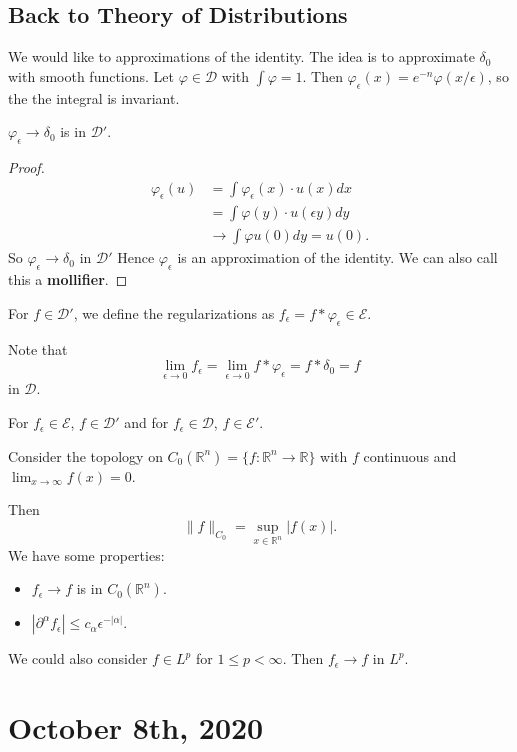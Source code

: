 \documentclass[11pt]{scrartcl}
\newcommand{\R}{\mathbb{R}}
\let \phi \varphi
\begin{document}
\subsection{Back to Theory of Distributions}
We would like to approximations of the identity.  The idea is to approximate $\delta_0$ with smooth functions. Let $\phi \in \mathcal D$ with $\int \phi = 1$.  Then $\phi_\epsilon(x) = e^{-n}\phi(x/\epsilon)$, so the the integral is invariant.
\begin{proposition} $\phi_\epsilon\rightarrow \delta_0$ is in $\mathcal D'$.
\end{proposition}
\begin{proof}
\begin{align*}
\phi_\epsilon(u) &= \int \phi_\epsilon(x) \cdot u(x)dx \\
&= \int \phi(y) \cdot u(\epsilon y) dy \\
&\rightarrow \int \phi u(0) dy = u(0).
\end{align*}
So $\phi_\epsilon \rightarrow \delta_0$ in $\mathcal D'$  Hence $\phi_\epsilon$ is an approximation of the identity.  We can also call this a \textbf{mollifier}.
\end{proof} 
For $f \in \mathcal D'$, we define the regularizations as $f_\epsilon = f * \phi_\epsilon \in \mathcal E$.  

Note that $$\lim_{\epsilon \rightarrow 0} f_\epsilon = \lim_{\epsilon \rightarrow 0} f*\phi_\epsilon = f*\delta_0 = f$$ in $\mathcal D$. 

For $f_{\epsilon} \in \mathcal E$, $f \in \mathcal D'$ and for $f_{\epsilon} \in \mathcal D$, $f \in \mathcal E'$.

\begin{example} Consider the topology on $C_0(\R^n) = \{f : \R^n \rightarrow \R\}$ with $f $ continuous and $\lim_{x \rightarrow \infty} f(x) = 0$. 

Then $$\|f\|_{C_0} = \sup_{x \in \R^n}|f(x)|.$$
We have some properties:
\begin{itemize}
\item $f_\epsilon \rightarrow f$ is in $C_0(\R^n)$.
\item $|\partial^{\alpha} f_\epsilon| \le c_{\alpha}\epsilon^{-|\alpha|}.$
\end{itemize}

We could also consider $f \in L^p$ for $1 \le p < \infty$.  Then $f_{\epsilon} \rightarrow f$ in $L^p$.  
\end{example} 
\pagebreak
\section{October 8th, 2020}
\end{document}
